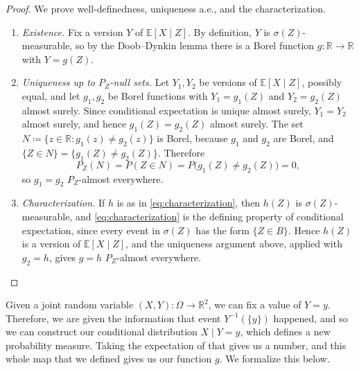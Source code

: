 	\begin{proof}
		We prove well-definedness, uniqueness a.e., and the characterization. 
		\begin{enumerate}
		  \item \textit{Existence.} Fix a version $Y$ of $\mathbb{E}[X \mid Z]$. By definition, $Y$ is $\sigma(Z)$-measurable, so by the Doob--Dynkin lemma there is a Borel function $g \colon \mathbb{R} \to \mathbb{R}$ with $Y = g(Z)$.

			\item \textit{Uniqueness up to $P_Z$-null sets.} Let $Y_1, Y_2$ be versions of $\mathbb{E}[X \mid Z]$, possibly equal, and let $g_1, g_2$ be Borel functions with $Y_1 = g_1(Z)$ and $Y_2 = g_2(Z)$ almost surely. Since conditional expectation is unique almost surely, $Y_1 = Y_2$ almost surely, and hence $g_1(Z) = g_2(Z)$ almost surely. The set $N \coloneqq \{z \in \mathbb{R} : g_1(z) \neq g_2(z)\}$ is Borel, because $g_1$ and $g_2$ are Borel, and $\{Z \in N\} = \{g_1(Z) \neq g_2(Z)\}$. Therefore
				\begin{equation}
					P_Z(N) = P(Z \in N) = P\big(g_1(Z) \neq g_2(Z)\big) = 0,
				\end{equation}
				so $g_1 = g_2$ $P_Z$-almost everywhere. 

			\item \textit{Characterization.} If $h$ is as in \eqref{eq:characterization}, then $h(Z)$ is $\sigma(Z)$-measurable, and \eqref{eq:characterization} is the defining property of conditional expectation, since every event in $\sigma(Z)$ has the form $\{Z \in B\}$. Hence $h(Z)$ is a version of $\mathbb{E}[X \mid Z]$, and the uniqueness argument above, applied with $g_2 = h$, gives $g = h$ $P_Z$-almost everywhere.
		\end{enumerate}
	\end{proof}

	Given a joint random variable $(X, Y): \Omega \rightarrow \mathbb{R}^2$, we can fix a value of $Y = y$. Therefore, we are given the information that event $Y^{-1}(\{y\})$ happened, and so we can construct our conditional distribution $X \mid Y = y$, which defines a new probability measure. Taking the expectation of that gives us a number, and this whole map that we defined gives us our function $g$. We formalize this below. 

